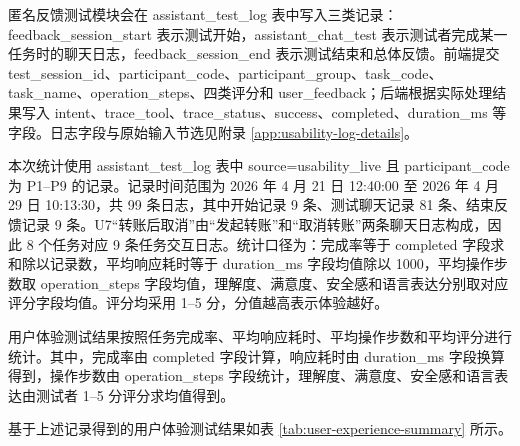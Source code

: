 \documentclass[bachelor, print]{xduthesis}
\begin{document}
匿名反馈测试模块会在 assistant\_test\_log 表中写入三类记录：feedback\_session\_start 表示测试开始，assistant\_chat\_test 表示测试者完成某一任务时的聊天日志，feedback\_session\_end 表示测试结束和总体反馈。前端提交 test\_session\_id、participant\_code、participant\_group、task\_code、task\_name、operation\_steps、四类评分和 user\_feedback；后端根据实际处理结果写入 intent、trace\_tool、trace\_status、success、completed、duration\_ms 等字段。日志字段与原始输入节选见附录 \ref{app:usability-log-details}。

本次统计使用 assistant\_test\_log 表中 source=usability\_live 且 participant\_code 为 P1--P9 的记录。记录时间范围为 2026 年 4 月 21 日 12:40:00 至 2026 年 4 月 29 日 10:13:30，共 99 条日志，其中开始记录 9 条、测试聊天记录 81 条、结束反馈记录 9 条。U7“转账后取消”由“发起转账”和“取消转账”两条聊天日志构成，因此 8 个任务对应 9 条任务交互日志。统计口径为：完成率等于 completed 字段求和除以记录数，平均响应耗时等于 duration\_ms 字段均值除以 1000，平均操作步数取 operation\_steps 字段均值，理解度、满意度、安全感和语言表达分别取对应评分字段均值。评分均采用 1--5 分，分值越高表示体验越好。

用户体验测试结果按照任务完成率、平均响应耗时、平均操作步数和平均评分进行统计。其中，完成率由 completed 字段计算，响应耗时由 duration\_ms 字段换算得到，操作步数由 operation\_steps 字段统计，理解度、满意度、安全感和语言表达由测试者 1--5 分评分求均值得到。

基于上述记录得到的用户体验测试结果如表 \ref{tab:user-experience-summary} 所示。
\end{document}
